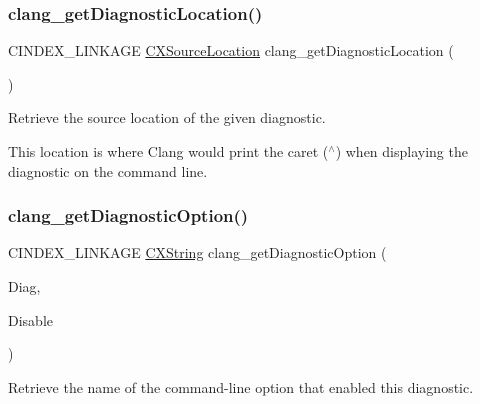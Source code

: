 \subsubsection{\texorpdfstring{clang\+\_\+get\+Diagnostic\+Location()}{clang\_getDiagnosticLocation()}}
{\footnotesize\ttfamily C\+I\+N\+D\+E\+X\+\_\+\+L\+I\+N\+K\+A\+GE \mbox{\hyperlink{structCXSourceLocation}{C\+X\+Source\+Location}} clang\+\_\+get\+Diagnostic\+Location (\begin{DoxyParamCaption}\item[{\mbox{\hyperlink{group__CINDEX__DIAG_ga44bb8aba7c40590ad25d1763c4fbff7f}{C\+X\+Diagnostic}}}]{ }\end{DoxyParamCaption})}



Retrieve the source location of the given diagnostic. 

This location is where Clang would print the caret (\textquotesingle{}$^\wedge$\textquotesingle{}) when displaying the diagnostic on the command line. \mbox{\label{group__CINDEX__DIAG_ga69b094e2cca1cd6f452327dc9204a168}} 
\subsubsection{\texorpdfstring{clang\+\_\+get\+Diagnostic\+Option()}{clang\_getDiagnosticOption()}}
{\footnotesize\ttfamily C\+I\+N\+D\+E\+X\+\_\+\+L\+I\+N\+K\+A\+GE \mbox{\hyperlink{structCXString}{C\+X\+String}} clang\+\_\+get\+Diagnostic\+Option (\begin{DoxyParamCaption}\item[{\mbox{\hyperlink{group__CINDEX__DIAG_ga44bb8aba7c40590ad25d1763c4fbff7f}{C\+X\+Diagnostic}}}]{Diag,  }\item[{\mbox{\hyperlink{structCXString}{C\+X\+String}} $\ast$}]{Disable }\end{DoxyParamCaption})}



Retrieve the name of the command-\/line option that enabled this diagnostic. 


